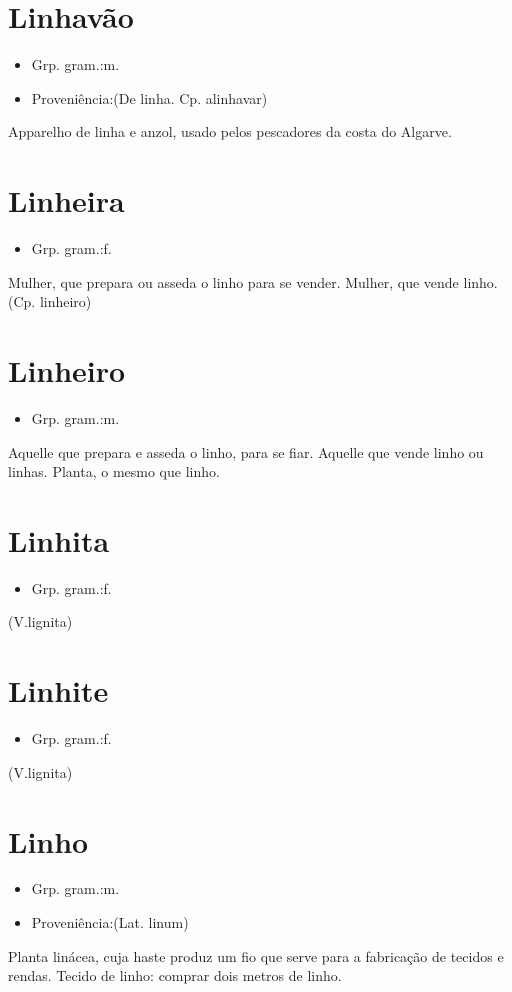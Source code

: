 \section{Linhavão}
\begin{itemize}
\item {Grp. gram.:m.}
\end{itemize}
\begin{itemize}
\item {Proveniência:(De \textunderscore linha\textunderscore . Cp. \textunderscore alinhavar\textunderscore )}
\end{itemize}
Apparelho de linha e anzol, usado pelos pescadores da costa do Algarve.
\section{Linheira}
\begin{itemize}
\item {Grp. gram.:f.}
\end{itemize}
Mulher, que prepara ou asseda o linho para se vender.
Mulher, que vende linho.
(Cp. \textunderscore linheiro\textunderscore )
\section{Linheiro}
\begin{itemize}
\item {Grp. gram.:m.}
\end{itemize}
Aquelle que prepara e asseda o linho, para se fiar.
Aquelle que vende linho ou linhas.
Planta, o mesmo que \textunderscore linho\textunderscore .
\section{Linhita}
\begin{itemize}
\item {Grp. gram.:f.}
\end{itemize}
(V.lignita)
\section{Linhite}
\begin{itemize}
\item {Grp. gram.:f.}
\end{itemize}
(V.lignita)
\section{Linho}
\begin{itemize}
\item {Grp. gram.:m.}
\end{itemize}
\begin{itemize}
\item {Proveniência:(Lat. \textunderscore linum\textunderscore )}
\end{itemize}
Planta linácea, cuja haste produz um fio que serve para a fabricação de tecidos e rendas.
Tecido de linho: \textunderscore comprar dois metros de linho\textunderscore .
